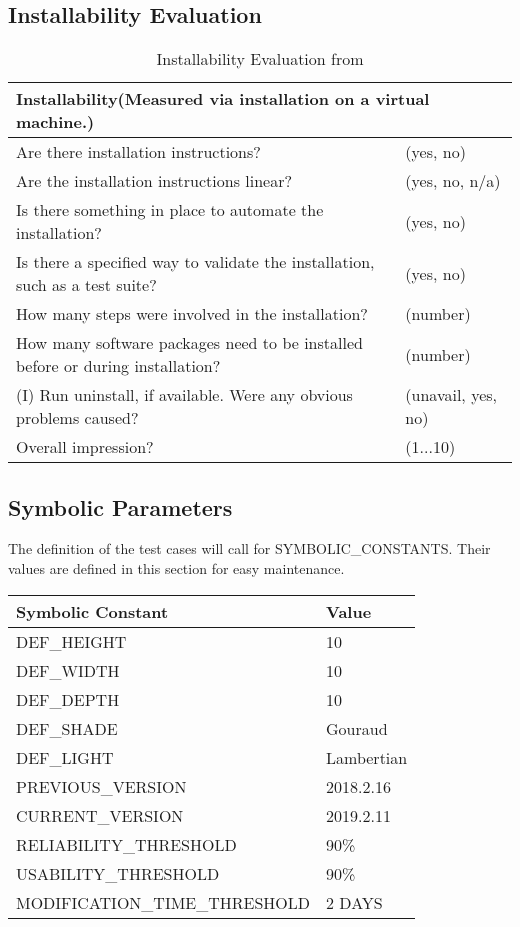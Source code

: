 \documentclass[12pt, titlepage]{article}
\begin{document}
\subsection{Installability Evaluation \protect
	\cite{SmithEtAl2018}}
\begin{table}[h]
	\begin{tabular}{p{10cm}p{5cm}}
		\hline
		\multicolumn{2}{l}{\textbf{Installability}(Measured via installation on 
		a virtual machine.)} \\
		\hline
		Are there installation instructions? & ({yes, no}) \\
		Are the installation instructions linear? & ({yes, no, n/a}) \\
		Is there something in place to automate the installation? & ({yes, no}) 
		\\		
		Is there a specified way to validate the installation, such as a test 
		suite? & ({yes, no}) \\
		How many steps were involved in the installation? & (number) \\
		How many software packages need to be installed before or during 
		installation? & (number) \\
		(I) Run uninstall, if available. Were any obvious problems caused? & 
		({unavail, yes, no}) \\
		Overall impression? & ({1...10}) \\
		\hline
	\end{tabular}
	\caption{Installability Evaluation from \protect\cite{SmithEtAl2018}}
	\label{tbl:installability}
\end{table}

\subsection{Symbolic Parameters}
The definition of the test cases will call for SYMBOLIC\_CONSTANTS.
Their values are defined in this section for easy maintenance.

\begin{tabular}{p{10cm}|p{5cm}}
	\textbf{Symbolic Constant} & \textbf{Value} \\
	\hline
	DEF\_HEIGHT & 10 \\
	DEF\_WIDTH & 10 \\
	DEF\_DEPTH & 10 \\
	DEF\_SHADE & Gouraud \\
	DEF\_LIGHT & Lambertian \\
	PREVIOUS\_VERSION & 2018.2.16 \\
	CURRENT\_VERSION & 2019.2.11\\
	RELIABILITY\_THRESHOLD & 90\%\\
	USABILITY\_THRESHOLD & 90\%\\
	MODIFICATION\_TIME\_THRESHOLD & 2 DAYS \\
\end{tabular}
\end{document}
